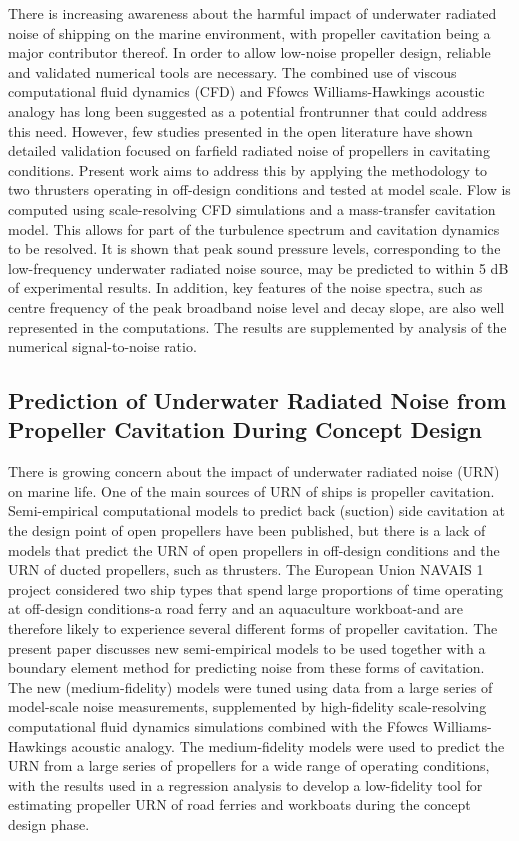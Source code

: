 \documentclass[a4paper,10pt]{article}
\begin{document}
There is increasing awareness about the harmful impact of underwater radiated noise of shipping on the marine environment, with propeller cavitation being a major contributor thereof. In order to allow low-noise propeller design, reliable and validated numerical tools are necessary. The combined use of viscous computational fluid dynamics (CFD) and Ffowcs Williams-Hawkings acoustic analogy has long been suggested as a potential frontrunner that could address this need. However, few studies presented in the open literature have shown detailed validation focused on farfield radiated noise of propellers in cavitating conditions. Present work aims to address this by applying the methodology to two thrusters operating in off-design conditions and tested at model scale. Flow is computed using scale-resolving CFD simulations and a mass-transfer cavitation model. This allows for part of the turbulence spectrum and cavitation dynamics to be resolved. It is shown that peak sound pressure levels, corresponding to the low-frequency underwater radiated noise source, may be predicted to within 5 dB of experimental results. In addition, key features of the noise spectra, such as centre frequency of the peak broadband noise level and decay slope, are also well represented in the computations. The results are supplemented by analysis of the numerical signal-to-noise ratio.

\subsection{Prediction of Underwater Radiated Noise from Propeller Cavitation During Concept Design \cite{lafeber_prediction_2022}}

There is growing concern about the impact of underwater radiated noise (URN) on marine life. One of the main sources of URN of ships is propeller cavitation. Semi-empirical computational models to predict back (suction) side cavitation at the design point of open propellers have been published, but there is a lack of models that predict the URN of open propellers in off-design conditions and the URN of ducted propellers, such as thrusters. The European Union NAVAIS 1 project considered two ship types that spend large proportions of time operating at off-design conditions-a road ferry and an aquaculture workboat-and are therefore likely to experience several different forms of propeller cavitation. The present paper discusses new semi-empirical models to be used together with a boundary element method for predicting noise from these forms of cavitation. The new (medium-fidelity) models were tuned using data from a large series of model-scale noise measurements, supplemented by high-fidelity scale-resolving computational fluid dynamics simulations combined with the Ffowcs Williams-Hawkings acoustic analogy. The medium-fidelity models were used to predict the URN from a large series of propellers for a wide range of operating conditions, with the results used in a regression analysis to develop a low-fidelity tool for estimating propeller URN of road ferries and workboats during the concept design phase.
\end{document}
